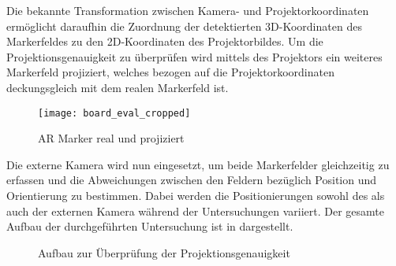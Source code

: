 Die bekannte Transformation zwischen Kamera- und Projektorkoordinaten ermöglicht daraufhin die Zuordnung der detektierten 3D-Koordinaten des Markerfeldes zu den 2D-Koordinaten des Projektorbildes. Um die Projektionsgenauigkeit zu überprüfen wird mittels des Projektors ein weiteres Markerfeld projiziert, welches bezogen auf die Projektorkoordinaten deckungsgleich mit dem realen Markerfeld ist. \\

\begin{figure}[!ht]
	\begin{center}
		\texttt{[image: board\_eval\_cropped]}
		\caption{AR Marker real und projiziert}
		\label{fig.arprojected}
	\end{center}
\end{figure}

Die externe Kamera wird nun eingesetzt, um beide Markerfelder gleichzeitig zu erfassen und die Abweichungen zwischen den Feldern bezüglich Position und Orientierung zu bestimmen. Dabei werden die Positionierungen sowohl des  als auch der externen Kamera während der Untersuchungen variiert. Der gesamte Aufbau der durchgeführten Untersuchung ist in  dargestellt.

\begin{figure}[ht]
	\begin{center}%
		\caption{Aufbau zur Überprüfung der Projektionsgenauigkeit}
		\label{fig.projsetup}
	\end{center}
\end{figure}

\red[Die Ergebnisse der $n=6$ Messreihen sind als Box-Whisker-Plot in \abb{fig.boxplot_proj} dargestellt.]






%
